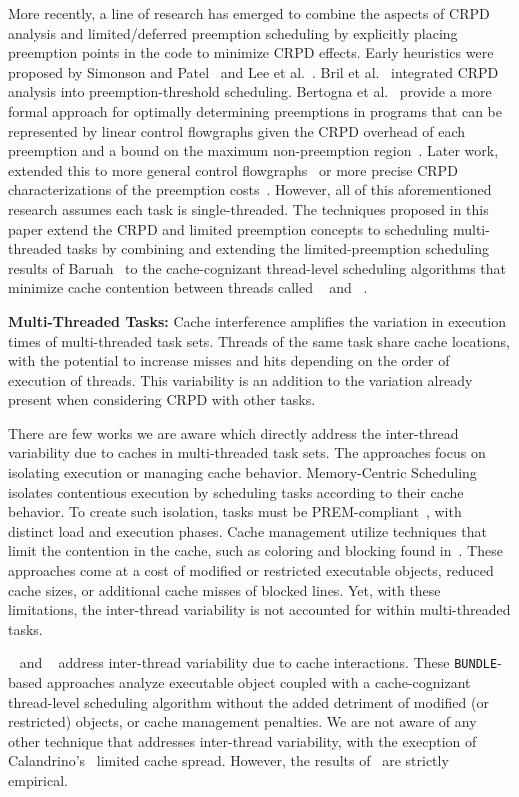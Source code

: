 More recently, a line of research has emerged to combine the aspects
of CRPD analysis and limited/deferred preemption scheduling by
explicitly placing preemption points in the code to minimize CRPD
effects.  Early heuristics were proposed by Simonson and
Patel~\cite{Simonson:1995} and Lee et al.~\cite{Lee:1998}.  Bril et
al.~\cite{Bril:2017} integrated CRPD analysis into preemption-threshold
scheduling.  Bertogna et al.~\cite{Bertogna:2011} provide a more formal
approach for optimally determining preemptions in programs that can be
represented by linear control flowgraphs given the CRPD overhead of
each preemption and a bound on the maximum non-preemption
region~\cite{Baruah:2005}. Later work, extended this to more general
control flowgraphs~\cite{Peng:2014} or more precise CRPD
characterizations of the preemption costs~\cite{Cavicchio:2015}.
However, all of this aforementioned research assumes each task is
single-threaded.  The techniques proposed in this paper extend
the CRPD and limited preemption concepts to scheduling multi-threaded
tasks by combining and extending the limited-preemption scheduling
results of Baruah~\cite{Baruah:2005} to the cache-cognizant
thread-level scheduling algorithms that minimize cache contention
between threads called \bundle{}~\cite{Tessler:2016} and
\bundlep{}~\cite{Tessler:2018}.


\noindent
\textbf{Multi-Threaded Tasks:} Cache interference amplifies 
the variation in execution times of multi-threaded task sets. Threads
of the same task share cache locations, with the potential to increase
misses and hits depending on the order of execution of
threads. This variability is an addition to the variation already
present when considering CRPD with other tasks.

  There are few works we are aware which directly address the
inter-thread variability due to caches in multi-threaded task
sets. The approaches focus on isolating execution or managing cache
behavior. Memory-Centric Scheduling~\cite{Bak:2012} isolates
contentious execution by scheduling tasks according to their cache
behavior. To create such isolation, tasks must be
PREM-compliant~\cite{Pellizzoni:2011}, with distinct load and
execution phases. Cache management utilize techniques that limit the
contention in the cache, such as coloring and blocking found
in~\cite{Ward:2013}. These approaches come at a cost of modified or
restricted executable objects, reduced cache sizes, or additional
cache misses of blocked lines. Yet, with these limitations, the
inter-thread variability is not accounted for within multi-threaded
tasks. 

\bundle{}~\cite{Tessler:2016} and \bundlep{}~\cite{Tessler:2018}
address inter-thread variability due to cache interactions. These
\texttt{BUNDLE}-based approaches analyze executable object coupled
with a cache-cognizant thread-level scheduling algorithm without the
added detriment of modified (or restricted) objects, or cache
management penalties. We are not aware of any other technique that
addresses inter-thread variability, with the execption of
Calandrino's~\cite{Calandrino:2009} limited cache spread. However, the
results of~\cite{Calandrino:2009} are strictly empirical.


